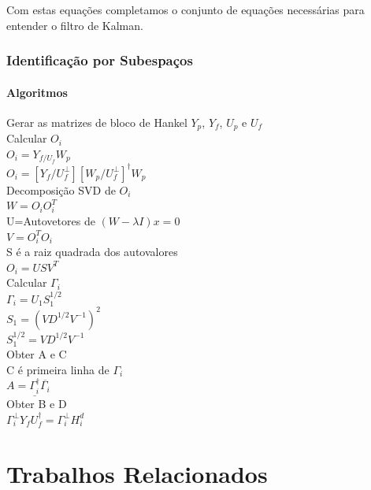 Com estas equações completamos o conjunto de equações necessárias para entender o filtro de Kalman.

\subsubsection {Identificação por Subespaços}
\paragraph{Algoritmos}\label{s:subalgoritmos}

\IncMargin{1em}
\begin{algorithm}[H]
	\nl Gerar as matrizes de bloco de Hankel $Y_p$, $Y_f$, $U_p$ e $U_f$\\
	\nl Calcular $O_i$ \\
	$O_i=Y_{f/U_f} W_p$\\
	$O_i=[Y_f/U_f^\perp][W_p/U_f^\perp]^\dagger W_p$\\
	\nl Decomposição SVD de $O_i$ \\
	$W=O_i  O_i^T$\\
	U=Autovetores de $(W-\lambda I)x=0$\\
	$V=O_i^T O_i$\\
	S é a raiz quadrada dos autovalores\\
	$O_i=USV^T$\\
	\nl Calcular $\Gamma_i$\\
	$\Gamma_i=U_1 S_1 ^{1/2}$\\
	$S_1=(VD^{1/2}V^{-1})^2$\\
	$S_1^{1/2}=VD^{1/2}V^{-1}$\\
	\nl Obter A e C \\
	C é  primeira linha de $\Gamma_i$\\
	$A=\underline{\Gamma_i^\dagger}\overline{\Gamma_i}$\\
	\nl Obter B e D\\
	$\Gamma_i ^\perp Y_f U_f ^\dagger=\Gamma_i ^\perp H^d_i$
	
	
\end{algorithm}
\DecMargin{1em}

\section{Trabalhos Relacionados}


















